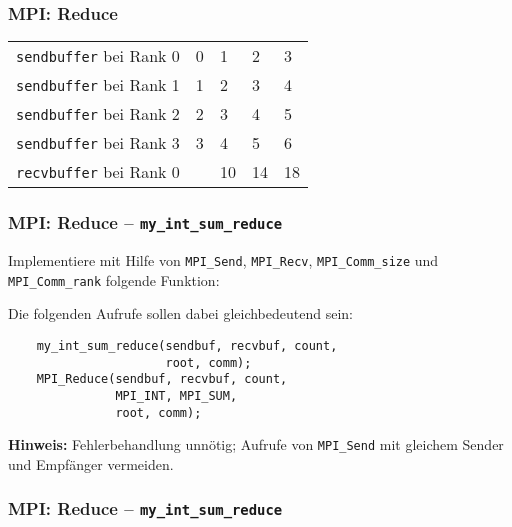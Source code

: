 \documentclass{beamer}
\begin{document}
\begin{frame}
  \frametitle{MPI: Reduce}
  \begin{table}
    \begin{tabular}{r|l l l l}
      \lstinline{sendbuffer} bei Rank 0 &       0 & 1 & 2 & 3 \\
      \lstinline{sendbuffer} bei Rank 1 &       1 & 2 & 3 & 4\\
      \lstinline{sendbuffer} bei Rank 2 &       2 & 3 & 4 & 5 \\
      \lstinline{sendbuffer} bei Rank 3 &       3 & 4 & 5 & 6 \\
      \lstinline{recvbuffer} bei Rank 0 &\pause 6 & 10 & 14 & 18 \\
    \end{tabular}
  \end{table}
\end{frame}

\begin{frame}[fragile]
  \frametitle{MPI: Reduce – \lstinline{my_int_sum_reduce}}
  Implementiere mit Hilfe von \lstinline{MPI_Send}, \lstinline{MPI_Recv}, \lstinline{MPI_Comm_size} und \lstinline{MPI_Comm_rank} folgende Funktion:
  
  Die folgenden Aufrufe sollen dabei gleichbedeutend sein:
  \begin{lstlisting}
    my_int_sum_reduce(sendbuf, recvbuf, count,
                      root, comm);
    MPI_Reduce(sendbuf, recvbuf, count,
               MPI_INT, MPI_SUM,
               root, comm);
  \end{lstlisting}
  
  \textbf{Hinweis:} Fehlerbehandlung unnötig; Aufrufe von \lstinline{MPI_Send} mit gleichem Sender und Empfänger vermeiden.
\end{frame}

\begin{frame}
  \frametitle{MPI: Reduce – \lstinline{my_int_sum_reduce}}
  
\end{frame}
\end{document}
